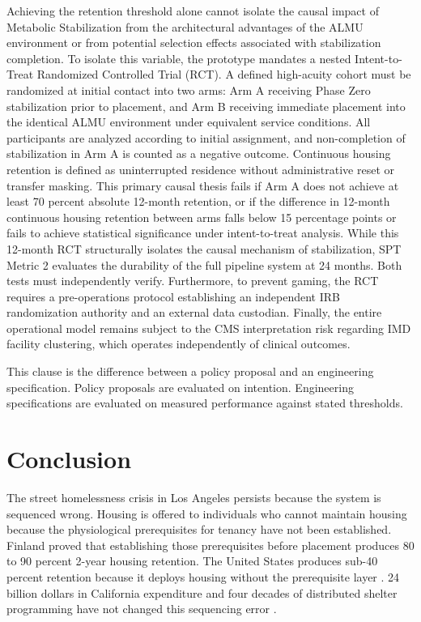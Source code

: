 \documentclass[12pt, letterpaper]{article}
\begin{document}
Achieving the retention threshold alone cannot isolate the causal impact of Metabolic Stabilization from the architectural advantages of the ALMU environment or from potential selection effects associated with stabilization completion. To isolate this variable, the prototype mandates a nested Intent-to-Treat Randomized Controlled Trial (RCT). A defined high-acuity cohort must be randomized at initial contact into two arms: Arm A receiving Phase Zero stabilization prior to placement, and Arm B receiving immediate placement into the identical ALMU environment under equivalent service conditions. All participants are analyzed according to initial assignment, and non-completion of stabilization in Arm A is counted as a negative outcome. Continuous housing retention is defined as uninterrupted residence without administrative reset or transfer masking. This primary causal thesis fails if Arm A does not achieve at least 70 percent absolute 12-month retention, or if the difference in 12-month continuous housing retention between arms falls below 15 percentage points or fails to achieve statistical significance under intent-to-treat analysis. While this 12-month RCT structurally isolates the causal mechanism of stabilization, SPT Metric 2 evaluates the durability of the full pipeline system at 24 months. Both tests must independently verify. Furthermore, to prevent gaming, the RCT requires a pre-operations protocol establishing an independent IRB randomization authority and an external data custodian. Finally, the entire operational model remains subject to the CMS interpretation risk regarding IMD facility clustering, which operates independently of clinical outcomes.

This clause is the difference between a policy proposal and an engineering specification. Policy proposals are evaluated on intention. Engineering specifications are evaluated on measured performance against stated thresholds.

\clearpage
{}
\section{Conclusion}

The street homelessness crisis in Los Angeles persists because the system is sequenced wrong. Housing is offered to individuals who cannot maintain housing because the physiological prerequisites for tenancy have not been established. Finland proved that establishing those prerequisites before placement produces 80 to 90 percent 2-year housing retention. The United States produces sub-40 percent retention because it deploys housing without the prerequisite layer \citep{ucsf_bhhi_2023}. 24 billion dollars in California expenditure and four decades of distributed shelter programming have not changed this sequencing error \citep{ca_24b_expenditure_2026, finland_housing_first_2023, feantsa_finland_2022}.
\end{document}
